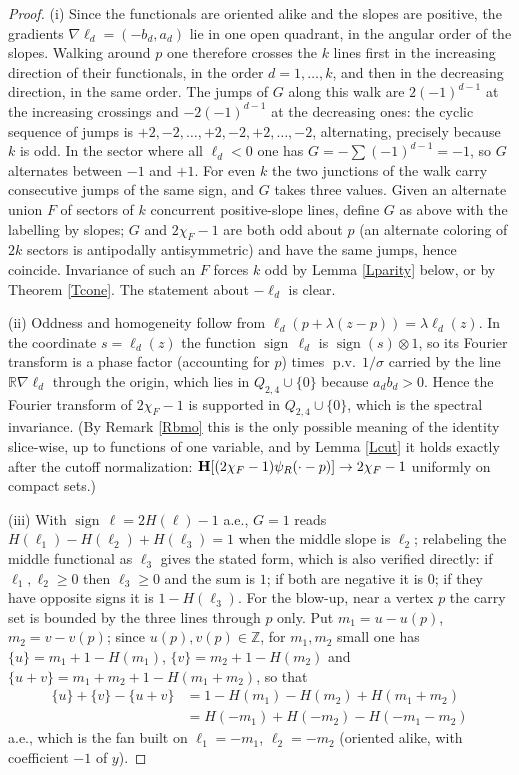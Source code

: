 \documentclass{article}
\newcommand{\tmop}[1]{\ensuremath{\operatorname{#1}}}
\def\H{{\bf H}}
\def\R{{\mathbb R}}
\def\Z{{\mathbb Z}}
\newcommand{\pv}{\operatorname{p.v.}}
\begin{document}
	\begin{proof}
		(i) Since the functionals are oriented alike and the slopes are positive, the gradients $\nabla\ell_d=(-b_d,a_d)$ lie in one open quadrant, in the angular order of the slopes. Walking around $p$ one therefore crosses the $k$ lines first in the increasing direction of their functionals, in the order $d=1,\dots,k$, and then in the decreasing direction, in the same order. The jumps of $G$ along this walk are $2(-1)^{d-1}$ at the increasing crossings and $-2(-1)^{d-1}$ at the decreasing ones: the cyclic sequence of jumps is $+2,-2,\dots,+2,-2,+2,\dots,-2$, alternating, precisely because $k$ is odd. In the sector where all $\ell_d<0$ one has $G=-\sum(-1)^{d-1}=-1$, so $G$ alternates between $-1$ and $+1$. For even $k$ the two junctions of the walk carry consecutive jumps of the same sign, and $G$ takes three values. Given an alternate union $F$ of sectors of $k$ concurrent positive-slope lines, define $G$ as above with the labelling by slopes; $G$ and $2\chi_F-1$ are both odd about $p$ (an alternate coloring of $2k$ sectors is antipodally antisymmetric) and have the same jumps, hence coincide. Invariance of such an $F$ forces $k$ odd by Lemma \ref{Lparity} below, or by Theorem \ref{Tcone}. The statement about $-\ell_d$ is clear.

		(ii) Oddness and homogeneity follow from $\ell_d(p+\lambda(z-p))=\lambda\ell_d(z)$. In the coordinate $s=\ell_d(z)$ the function $\tmop{sign}\,\ell_d$ is $\tmop{sign}(s)\otimes 1$, so its Fourier transform is a phase factor (accounting for $p$) times $\pv\,1/\sigma$ carried by the line $\R\nabla\ell_d$ through the origin, which lies in $Q_{2,4}\cup\{0\}$ because $a_db_d>0$. Hence the Fourier transform of $2\chi_F-1$ is supported in $Q_{2,4}\cup\{0\}$, which is the spectral invariance. (By Remark \ref{Rbmo} this is the only possible meaning of the identity slice-wise, up to functions of one variable, and by Lemma \ref{Lcut} it holds exactly after the cutoff normalization: $\H[(2\chi_F-1)\psi_R(\cdot-p)]\to2\chi_F-1$ uniformly on compact sets.)

		(iii) With $\tmop{sign}\,\ell=2H(\ell)-1$ a.e., $G=1$ reads $H(\ell_1)-H(\ell_2)+H(\ell_3)=1$ when the middle slope is $\ell_2$; relabeling the middle functional as $\ell_3$ gives the stated form, which is also verified directly: if $\ell_1,\ell_2\ge0$ then $\ell_3\ge0$ and the sum is $1$; if both are negative it is $0$; if they have opposite signs it is $1-H(\ell_3)$. For the blow-up, near a vertex $p$ the carry set is bounded by the three lines through $p$ only. Put $m_1=u-u(p)$, $m_2=v-v(p)$; since $u(p),v(p)\in\Z$, for $m_1,m_2$ small one has $\{u\}=m_1+1-H(m_1)$, $\{v\}=m_2+1-H(m_2)$ and $\{u+v\}=m_1+m_2+1-H(m_1+m_2)$, so that
		\begin{align*}
		\{u\}+\{v\}-\{u+v\}&=1-H(m_1)-H(m_2)+H(m_1+m_2)\\
		&=H(-m_1)+H(-m_2)-H(-m_1-m_2)
		\end{align*}
		a.e., which is the fan built on $\ell_1=-m_1$, $\ell_2=-m_2$ (oriented alike, with coefficient $-1$ of $y$).
	\end{proof}
\end{document}
